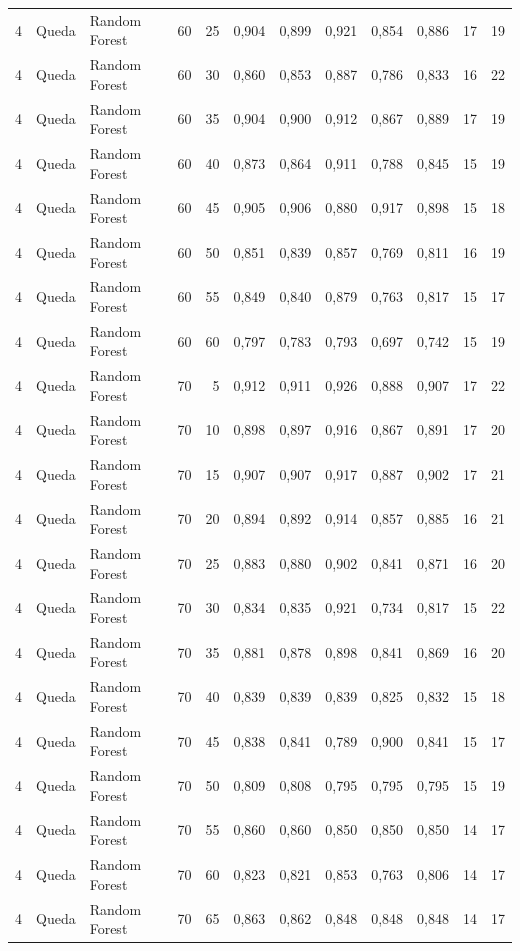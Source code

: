\begin{longtable}{@{}rllrrrrrrrrr@{}}
4 & Queda & Random Forest & 60 & 25 & 0,904 & 0,899 & 0,921 & 0,854 & 0,886 & 17 & 19 \\
4 & Queda & Random Forest & 60 & 30 & 0,860 & 0,853 & 0,887 & 0,786 & 0,833 & 16 & 22 \\
4 & Queda & Random Forest & 60 & 35 & 0,904 & 0,900 & 0,912 & 0,867 & 0,889 & 17 & 19 \\
4 & Queda & Random Forest & 60 & 40 & 0,873 & 0,864 & 0,911 & 0,788 & 0,845 & 15 & 19 \\
4 & Queda & Random Forest & 60 & 45 & 0,905 & 0,906 & 0,880 & 0,917 & 0,898 & 15 & 18 \\
4 & Queda & Random Forest & 60 & 50 & 0,851 & 0,839 & 0,857 & 0,769 & 0,811 & 16 & 19 \\
4 & Queda & Random Forest & 60 & 55 & 0,849 & 0,840 & 0,879 & 0,763 & 0,817 & 15 & 17 \\
4 & Queda & Random Forest & 60 & 60 & 0,797 & 0,783 & 0,793 & 0,697 & 0,742 & 15 & 19 \\
4 & Queda & Random Forest & 70 & 5 & 0,912 & 0,911 & 0,926 & 0,888 & 0,907 & 17 & 22 \\
4 & Queda & Random Forest & 70 & 10 & 0,898 & 0,897 & 0,916 & 0,867 & 0,891 & 17 & 20 \\
4 & Queda & Random Forest & 70 & 15 & 0,907 & 0,907 & 0,917 & 0,887 & 0,902 & 17 & 21 \\
4 & Queda & Random Forest & 70 & 20 & 0,894 & 0,892 & 0,914 & 0,857 & 0,885 & 16 & 21 \\
4 & Queda & Random Forest & 70 & 25 & 0,883 & 0,880 & 0,902 & 0,841 & 0,871 & 16 & 20 \\
4 & Queda & Random Forest & 70 & 30 & 0,834 & 0,835 & 0,921 & 0,734 & 0,817 & 15 & 22 \\
4 & Queda & Random Forest & 70 & 35 & 0,881 & 0,878 & 0,898 & 0,841 & 0,869 & 16 & 20 \\
4 & Queda & Random Forest & 70 & 40 & 0,839 & 0,839 & 0,839 & 0,825 & 0,832 & 15 & 18 \\
4 & Queda & Random Forest & 70 & 45 & 0,838 & 0,841 & 0,789 & 0,900 & 0,841 & 15 & 17 \\
4 & Queda & Random Forest & 70 & 50 & 0,809 & 0,808 & 0,795 & 0,795 & 0,795 & 15 & 19 \\
4 & Queda & Random Forest & 70 & 55 & 0,860 & 0,860 & 0,850 & 0,850 & 0,850 & 14 & 17 \\
4 & Queda & Random Forest & 70 & 60 & 0,823 & 0,821 & 0,853 & 0,763 & 0,806 & 14 & 17 \\
4 & Queda & Random Forest & 70 & 65 & 0,863 & 0,862 & 0,848 & 0,848 & 0,848 & 14 & 17 \\

\end{longtable}
